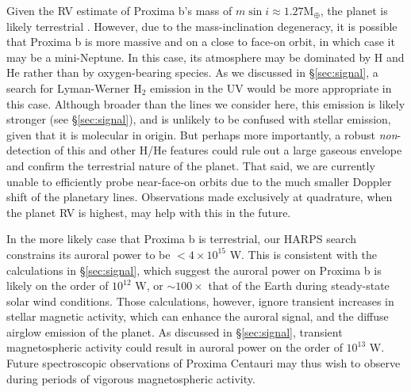 \documentclass[apjl]{emulateapj}
\begin{document}
Given the RV estimate of Proxima b's mass of $m {\sin} i \approx 1.27\mathrm{M_\oplus}$, the planet is likely terrestrial \citep{Anglada-Escude2016}. However, due to the mass-inclination degeneracy, it is possible that Proxima b is more massive and on a close to face-on orbit, in which case it may be a mini-Neptune. In this case, its atmosphere may be dominated by H and He rather than by oxygen-bearing species. As we discussed in \S\ref{sec:signal}, a search for Lyman-Werner H$_2$ emission in the UV would be more appropriate in this case. Although broader than the lines we consider here, this emission is likely stronger (see \S\ref{sec:signal}), and is unlikely to be confused with stellar emission, given that it is molecular in origin. But perhaps more importantly, a robust \textit{non}-detection of this and other H/He features could rule out a large gaseous envelope and confirm the terrestrial nature of the planet. That said, we are currently unable to efficiently probe near-face-on orbits due to the much smaller Doppler shift of the planetary lines. Observations made exclusively at quadrature, when the planet RV is highest, may help with this in the future.

In the more likely case that Proxima b is terrestrial, our HARPS search constrains its auroral power to be $< 4\times 10^{15}$ W. This is consistent with the calculations in \S\ref{sec:signal}, which suggest the auroral power on Proxima b is likely on the order of $10^{12}$ W, or $\sim 100\times$ that of the Earth during steady-state solar wind conditions. Those calculations, however, ignore transient increases in stellar magnetic activity, which can enhance the auroral signal, and the diffuse airglow emission of the planet. As discussed in \S\ref{sec:signal}, transient magnetospheric activity could result in auroral power on the order of $10^{13}$ W. Future spectroscopic observations of Proxima Centauri may thus wish to observe during periods of vigorous magnetospheric activity.
\end{document}

